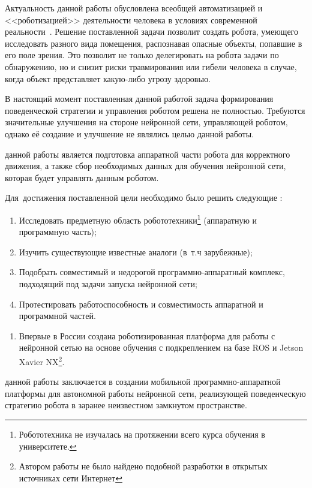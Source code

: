
{\actuality} Актуальность данной работы обусловлена всеобщей автоматизацией и <<роботизацией>> деятельности человека в условиях современной реальности~\cite{robotization}. Решение поставленной задачи позволит создать робота, умеющего исследовать разного вида помещения, распознавая опасные объекты, попавшие в его поле зрения. Это позволит не только делегировать на робота задачи по обнаружению, но и снизит риски травмирования или гибели человека в случае, когда объект представляет какую-либо угрозу здоровью.


{\progress} В настоящий момент поставленная данной работой задача формирования поведенческой стратегии и управления роботом решена не полностью. Требуются значительные улучшения на стороне нейронной сети, управляющей роботом, однако её создание и улучшение не являлись целью данной работы.


{\aim} данной работы является подготовка аппаратной части робота для корректного движения, а также сбор необходимых данных для обучения нейронной сети, которая будет управлять данным роботом.


Для~достижения поставленной цели необходимо было решить следующие {\tasks}:
\begin{enumerate}[beginpenalty=10000] %
  \item Исследовать предметную область робототехники\footnote{Робототехника не изучалась на протяжении всего курса обучения в университете.} (аппаратную и программную часть);
  \item Изучить существующие известные аналоги (в~т.\:ч зарубежные);
  \item Подобрать совместимый и недорогой программно-аппаратный комплекс, подходящий под задачи запуска нейронной сети;
  \item Протестировать работоспособность и совместимость аппаратной и программной частей.
\end{enumerate}


{\novelty}
\begin{enumerate}[beginpenalty=10000] %
  \item Впервые в России создана роботизированная платформа для работы с нейронной сетью на основе обучения с подкреплением на базе ROS и Jetson Xavier NX\footnote{Автором работы не было найдено подобной разработки в открытых источниках сети Интернет}.
\end{enumerate}

{\influence} данной работы заключается в создании мобильной программно-аппаратной платформы для автономной работы нейронной сети, реализующей поведенческую стратегию робота в заранее неизвестном замкнутом пространстве.


